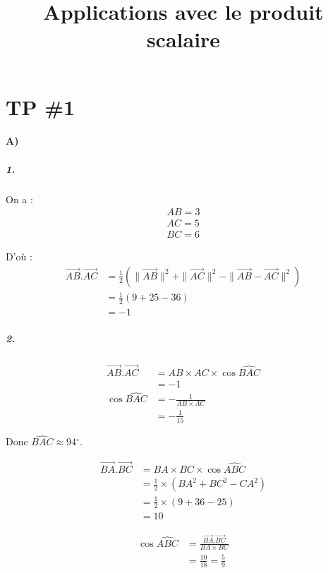 \documentclass[12pt]{article}
\title{\textbf{Applications avec le produit scalaire}}
\date{}
\newcommand{\degree}{\ensuremath{^\circ}}
\begin{document}
\maketitle

\section*{TP \#1}

\paragraph{A)}
\subparagraph{1.}
On a :
\begin{align*}
AB = 3\\
AC = 5\\
BC = 6
\end{align*}

D'où :
\begin{align*}
\overrightarrow{AB}.\overrightarrow{AC} &= \frac{1}{2}(\|\overrightarrow{AB}\|^2+\|\overrightarrow{AC}\|^2-\|\overrightarrow{AB}-\overrightarrow{AC}\|^2)\\
&= \frac{1}{2}(9 + 25 - 36)\\
&= -1
\end{align*}

\subparagraph{2.}

\begin{align*}
\overrightarrow{AB}.\overrightarrow{AC} &= AB \times AC \times \cos \widehat{BAC}\\
&= -1\\
\cos \widehat{BAC} &= - \frac{1}{AB \times AC}\\
&= - \frac{1}{15}
\end{align*}

Donc $\widehat{BAC} \approx 94\degree$.

\begin{align*}
\overrightarrow{BA}.\overrightarrow{BC} &= BA \times BC \times \cos \widehat{ABC}\\
&= \frac{1}{2} \times (BA^2 + BC^2 - CA^2)\\
&= \frac{1}{2} \times (9 + 36 - 25)\\
&= 10
\end{align*}

\begin{align*}
\cos \widehat{ABC} &= \frac{\overrightarrow{BA}.\overrightarrow{BC}}{BA \times BC}\\
&= \frac{10}{18} = \frac{5}{9}
\end{align*}
\end{document}
